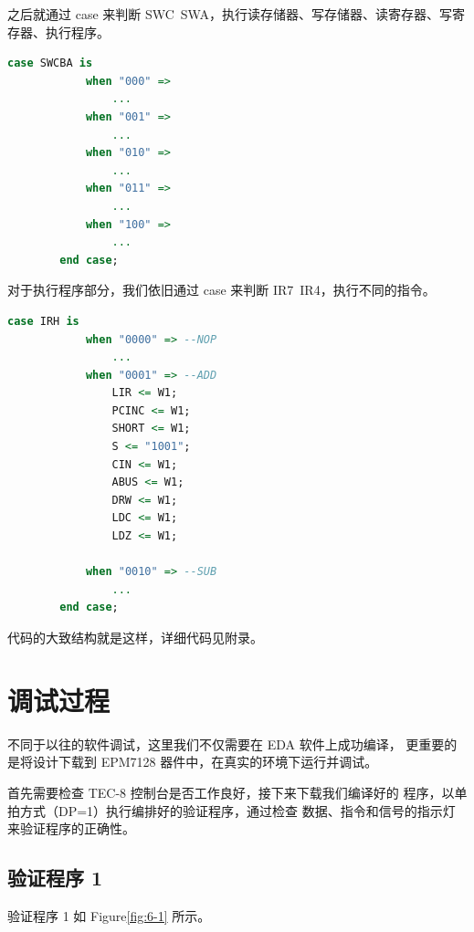 \documentclass[12pt]{article}
\begin{document}
{    之后就通过 case 来判断 SWC~SWA，执行读存储器、写存储器、读寄存器、写寄存器、执行程序。
    
    \begin{lstlisting}[language=vhdl]
        case SWCBA is
            when "000" => 
                ...
            when "001" =>
                ...
            when "010" =>
                ...
            when "011" =>
                ...
            when "100" =>
                ...
        end case;
    \end{lstlisting}
    
    对于执行程序部分，我们依旧通过 case 来判断 IR7~IR4，执行不同的指令。
    
    \begin{lstlisting}[language=vhdl]
        case IRH is
            when "0000" => --NOP
                ...
            when "0001" => --ADD
                LIR <= W1;
                PCINC <= W1;
                SHORT <= W1;
                S <= "1001";
                CIN <= W1;
                ABUS <= W1;
                DRW <= W1;
                LDC <= W1;
                LDZ <= W1;

            when "0010" => --SUB
                ...
        end case;
    \end{lstlisting}
    
    代码的大致结构就是这样，详细代码见附录。
    
\section{调试过程}
    不同于以往的软件调试，这里我们不仅需要在 EDA 软件上成功编译，
    更重要的是将设计下载到 EPM7128 器件中，在真实的环境下运行并调试。
    
    首先需要检查 TEC-8 控制台是否工作良好，接下来下载我们编译好的
    程序，以单拍方式（DP=1）执行编排好的验证程序，通过检查
    数据、指令和信号的指示灯来验证程序的正确性。
    
    \subsection{验证程序 1}
        验证程序 1 如 Figure\ref{fig:6-1} 所示。
        
}
\end{document}
